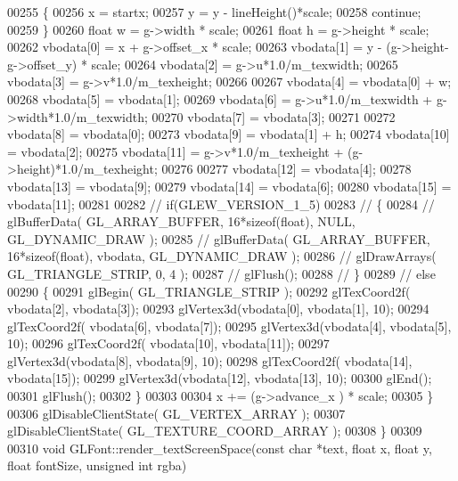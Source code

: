 \begin{DoxyCode}
00255         \{
00256             x = startx;
00257             y = y - lineHeight()*scale;
00258             \textcolor{keywordflow}{continue};
00259         \}
00260         \textcolor{keywordtype}{float} w = g->width * scale;
00261         \textcolor{keywordtype}{float} h = g->height * scale;
00262         vbodata[0] = x + g->offset_x * scale;
00263         vbodata[1] = y - (g->height-g->offset_y) * scale;
00264         vbodata[2] = g->u*1.0/m_texwidth;
00265         vbodata[3] = g->v*1.0/m_texheight;
00266 
00267         vbodata[4] = vbodata[0] + w;
00268         vbodata[5] = vbodata[1];
00269         vbodata[6] = g->u*1.0/m_texwidth + g->width*1.0/m_texwidth;
00270         vbodata[7] = vbodata[3];
00271 
00272         vbodata[8] = vbodata[0];
00273         vbodata[9] = vbodata[1] + h;
00274         vbodata[10] = vbodata[2];
00275         vbodata[11] = g->v*1.0/m_texheight + (g->height)*1.0/m_texheight;
00276 
00277         vbodata[12] = vbodata[4];
00278         vbodata[13] = vbodata[9];
00279         vbodata[14] = vbodata[6];
00280         vbodata[15] = vbodata[11];
00281 
00282 \textcolor{comment}{//        if(GLEW\_VERSION\_1\_5)}
00283 \textcolor{comment}{//        \{}
00284 \textcolor{comment}{//            glBufferData( GL\_ARRAY\_BUFFER, 16*sizeof(float), NULL, GL\_DYNAMIC\_DRAW );}
00285 \textcolor{comment}{//            glBufferData( GL\_ARRAY\_BUFFER, 16*sizeof(float), vbodata, GL\_DYNAMIC\_DRAW );}
00286 \textcolor{comment}{//            glDrawArrays( GL\_TRIANGLE\_STRIP, 0, 4 );}
00287 \textcolor{comment}{//            glFlush();}
00288 \textcolor{comment}{//        \}}
00289 \textcolor{comment}{//        else}
00290         \{
00291             glBegin( GL_TRIANGLE_STRIP );
00292             glTexCoord2f( vbodata[2], vbodata[3]);
00293             glVertex3d(vbodata[0], vbodata[1], 10);
00294             glTexCoord2f( vbodata[6], vbodata[7]);
00295             glVertex3d(vbodata[4], vbodata[5], 10);
00296             glTexCoord2f( vbodata[10], vbodata[11]);
00297             glVertex3d(vbodata[8], vbodata[9], 10);
00298             glTexCoord2f( vbodata[14], vbodata[15]);
00299             glVertex3d(vbodata[12], vbodata[13], 10);
00300             glEnd();
00301             glFlush();
00302         \}
00303 
00304         x += (g->advance_x ) * scale;
00305     \}
00306     glDisableClientState( GL_VERTEX_ARRAY );
00307     glDisableClientState( GL_TEXTURE_COORD_ARRAY );
00308 \}
00309 
00310 \textcolor{keywordtype}{void} GLFont::render_textScreenSpace(\textcolor{keyword}{const} \textcolor{keywordtype}{char} *text, \textcolor{keywordtype}{float} x, \textcolor{keywordtype}{float} y, \textcolor{keywordtype}{float} fontSize, \textcolor{keywordtype}{unsigned} \textcolor{keywordtype}{int} rgba)

\end{DoxyCode}
